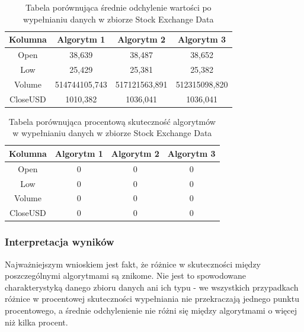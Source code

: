 \documentclass[12pt,twoside]{article}
\begin{document}
\begin{table}[ht]
    \caption{Tabela porównująca średnie odchylenie wartości po wypełnianiu danych w zbiorze Stock Exchange Data}
    \centering
    \begin{tabular}{|c|c|c|c|}
        \hline
        \textbf{Kolumna} & \textbf{Algorytm 1} & \textbf{Algorytm 2} & \textbf{Algorytm 3} \\ \hline
        Open             & 38,639              & 38,487              & 38,652              \\ \hline
        Low              & 25,429              & 25,381              & 25,382              \\ \hline
        Volume           & 514744105,743       & 517121563,891       & 512315098,820       \\ \hline
        CloseUSD         & 1010,382            & 1036,041            & 1036,041            \\ \hline
    \end{tabular}
    \label{tab:stock_aad}
\end{table}
\FloatBarrier

\begin{table}[ht]
    \caption{Tabela porównująca procentową skuteczność algorytmów w wypełnianiu danych w zbiorze Stock Exchange Data}
    \centering
    \begin{tabular}{|c|c|c|c|}
        \hline
        \textbf{Kolumna} & \textbf{Algorytm 1} & \textbf{Algorytm 2} & \textbf{Algorytm 3} \\ \hline
        Open             & 0                   & 0                   & 0                   \\ \hline
        Low              & 0                   & 0                   & 0                   \\ \hline
        Volume           & 0                   & 0                   & 0                   \\ \hline
        CloseUSD         & 0                   & 0                   & 0                   \\ \hline
    \end{tabular}
    \label{tab:stock_acc}
\end{table}
\FloatBarrier

\subsubsection{Interpretacja wyników}

Najważniejszym wnioskiem jest fakt, że różnice w skuteczności między poszczególnymi algorytmami są znikome.
Nie jest to spowodowane charakterystyką danego zbioru danych ani ich typu - we wszystkich przypadkach
różnice w procentowej skuteczności wypełniania nie przekraczają jednego punktu procentowego, a średnie odchylenienie
nie różni się między algorytmami o więcej niż kilka procent.
\end{document}

